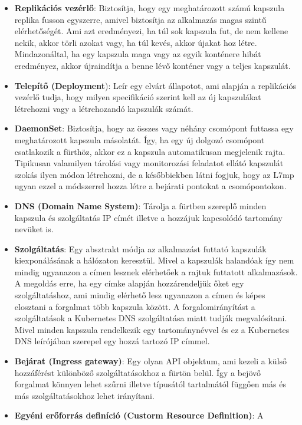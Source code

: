 \begin{itemize}
	\item \textbf{Replikációs vezérlő}: Biztosítja, hogy egy meghatározott számú 
	kapszula replika fusson egyszerre, amivel biztosítja az alkalmazás magas szintű
	elérhetőségét. Ami azt eredményezi, ha túl sok kapszula fut, de nem kellene nekik,
	akkor törli azokat vagy, ha túl kevés, akkor újakat hoz létre. Mindazonáltal, 
	ha egy kapszula maga vagy az egyik konténere hibát eredményez, akkor újraindítja
	a benne lévő konténer vagy a teljes kapszulát. 
	\item \textbf{Telepítő (Deployment}): Leír egy elvárt állapotot, ami alapján a
	replikációs vezérlő tudja, hogy milyen specifikáció szerint kell az új kapszulákat
	létrehozni vagy a létrehozandó kapszulák számát. 
	\item \textbf{DaemonSet}: Biztosítja, hogy az összes vagy néhány csomópont 
	futtassa egy meghatározott kapszula másolatát. Így, ha egy új dolgozó csomópont 
	csatlakozik a fürthöz, akkor ez a kapszula automatikusan megjelenik rajta. Tipikusan
	valamilyen tárolási vagy monitorozási feladatot ellátó kapszulát szokás ilyen
	módon létrehozni, de a későbbiekben látni fogjuk, hogy az L7mp ugyan ezzel a 
	módszerrel hozza létre a bejárati pontokat a csomópontokon.
	\item \textbf{DNS (Domain Name System)}: Tárolja a fürtben szereplő minden kapszula 
	és szolgáltatás IP címét illetve a hozzájuk kapcsolódó tartomány nevüket is.  
	\item \textbf{Szolgáltatás}: Egy absztrakt módja az alkalmazást futtató kapszulák
	kiexponálásának a hálózaton keresztül. Mivel a kapszulák halandóak így nem mindig
	ugyanazon a címen lesznek elérhetőek a rajtuk futtatott alkalmazások. A megoldás
	erre, ha egy címke alapján hozzárendeljük őket egy szolgáltatáshoz, ami mindig 
	elérhető lesz ugyanazon a címen és képes elosztani a forgalmat több kapszula között.
	A forgalomirányítást a szolgáltatások a Kubernetes DNS szolgáltatása miatt tudják 
	megvalósítani. Mivel minden kapszula rendelkezik egy tartománynévvel és ez a Kubernetes
	DNS leírójában szerepel egy hozzá tartozó IP címmel.
	\item \textbf{Bejárat (Ingress gateway)}: Egy olyan API objektum, ami kezeli a 
	külső hozzáférést különböző szolgáltatásokhoz a fürtön belül. Így a bejövő forgalmat
	könnyen lehet szűrni illetve típusától tartalmától függően más és más szolgáltatásokhoz
	lehet irányítani. 
	\item \textbf{Egyéni erőforrás definíció (Custorm Resource Definition)}: A 

\end{itemize}

